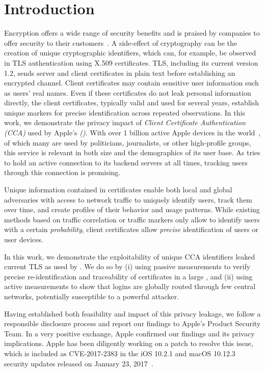 \section{Introduction}\label{sec:intro}
Encryption offers a wide range of security benefits and is praised by companies to offer security to their customers~\cite{2016cook}. 
A side-effect of cryptography can be the creation of unique cryptographic identifiers, which can, for example, be observed in TLS authentication using X.509 certificates.
TLS, including its current version 1.2, sends server and client certificates in plain text before establishing an encrypted channel.
Client certificates may contain sensitive user information such as users' real names.
Even if these certificates do not leak personal information directly, the client certificates, typically valid and used for several years, establish unique markers for precise identification across repeated observations.
In this work, we demonstrate the privacy impact of \emph{Client Certificate Authentication (CCA)} used by Apple's \emph{{\apnslong} ({\apns})}.
With over 1 billion active Apple devices in the world~\cite{apple1bn}, of which many are used by politicians, journalists, or other high-profile groups, this service is relevant in both size and the demographics of its user base.
As {\apns} tries to hold an active connection to its backend servers at
all times, tracking users through this connection is promising.

Unique information contained in certificates enable both local and
global adversaries with access to network traffic to uniquely identify users,
track them over time, and create profiles of their behavior and usage patterns.
While existing methods based on traffic correlation or traffic markers only allow
to identify users with a certain \textit{probability}, client certificates allow \textit{precise}
identification of users or user devices.

In this work, we demonstrate the exploitability of unique CCA identifiers leaked current TLS as used by {\apns}.
We do so by 
(i) using passive measurements to verify precise re-identification and traceability of certificates in a large \man, and 
(ii) using active measurements to show that {\apns} logins are globally routed through few central networks, potentially susceptible to a powerful attacker. 

Having established both feasibility and impact of this privacy leakage, we follow a responsible disclosure process and report our findings to Apple's Product Security Team. 
In a very positive exchange, Apple confirmed our findings and its privacy implications.
Apple has been diligently working on a patch to resolve this issue, which is included as CVE-2017-2383 in the iOS 10.2.1 and macOS 10.12.3 security updates released on January 23, 2017~\cite{ios1021}.


